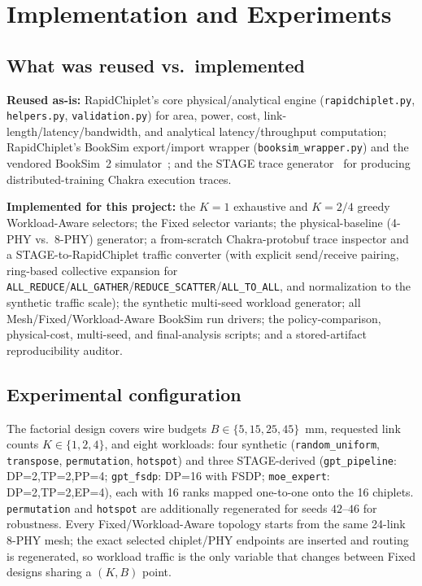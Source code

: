 \documentclass[conference]{IEEEtran}
\begin{document}
\section{Implementation and Experiments}
\label{sec:impl}

\subsection{What was reused vs.\ implemented}
\textbf{Reused as-is:} RapidChiplet's core physical/analytical engine (\texttt{rapidchiplet.py}, \texttt{helpers.py}, \texttt{validation.py}) for area, power, cost, link-length/latency/bandwidth, and analytical latency/throughput computation; RapidChiplet's BookSim export/import wrapper (\texttt{booksim\_wrapper.py}) and the vendored BookSim~2 simulator~\cite{booksim}; and the STAGE trace generator~\cite{stage} for producing distributed-training Chakra execution traces.

\textbf{Implemented for this project:} the $K{=}1$ exhaustive and $K{=}2/4$ greedy Workload-Aware selectors; the Fixed selector variants; the physical-baseline (4-PHY vs.\ 8-PHY) generator; a from-scratch Chakra-protobuf trace inspector and a STAGE-to-RapidChiplet traffic converter (with explicit send/receive pairing, ring-based collective expansion for \texttt{ALL\_REDUCE}/\texttt{ALL\_GATHER}/\texttt{REDUCE\_SCATTER}/\texttt{ALL\_TO\_ALL}, and normalization to the synthetic traffic scale); the synthetic multi-seed workload generator; all Mesh/Fixed/Workload-Aware BookSim run drivers; the policy-comparison, physical-cost, multi-seed, and final-analysis scripts; and a stored-artifact reproducibility auditor.

\subsection{Experimental configuration}
The factorial design covers wire budgets $B \in \{5,15,25,45\}$~mm, requested link counts $K \in \{1,2,4\}$, and eight workloads: four synthetic (\texttt{random\_uniform}, \texttt{transpose}, \texttt{permutation}, \texttt{hotspot}) and three STAGE-derived (\texttt{gpt\_pipeline}: DP=2,TP=2,PP=4; \texttt{gpt\_fsdp}: DP=16 with FSDP; \texttt{moe\_expert}: DP=2,TP=2,EP=4), each with 16 ranks mapped one-to-one onto the 16 chiplets. \texttt{permutation} and \texttt{hotspot} are additionally regenerated for seeds $42$--$46$ for robustness. Every Fixed/Workload-Aware topology starts from the same 24-link 8-PHY mesh; the exact selected chiplet/PHY endpoints are inserted and routing is regenerated, so workload traffic is the only variable that changes between Fixed designs sharing a $(K,B)$ point.
\end{document}
